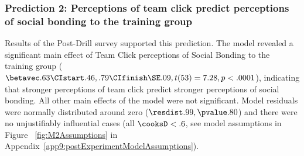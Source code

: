 


\subsubsection{Prediction 2: Perceptions of team click predict perceptions of social bonding to the training group}


Results of the Post-Drill survey supported this prediction. The model revealed a significant main effect of Team Click perceptions of Social Bonding to the training group ($\betavec .63 \CIstart .46, .79 \CIfinish \SE .09, t(53) = 7.28, p < .0001$), indicating that stronger perceptions of team click predict stronger perceptions of social bonding.  All other main effects of the model were not significant.  Model residuals were normally distributed around zero ($\resdist .99, \pvalue .80$) and there were no unjustifiably influential cases (all $\cooksD < .6$, see model assumptions in Figure ~\ref{fig:M2Assumptions} in Appendix~\ref{app9:postExperimentModelAssumptions}).






